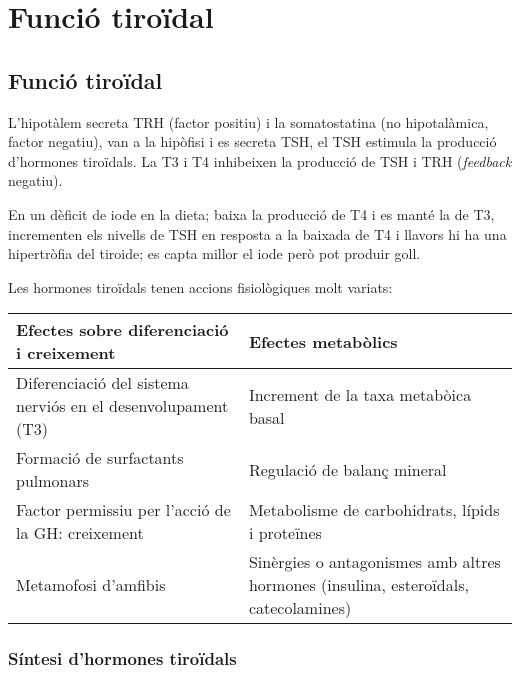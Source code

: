 
\section{Funció tiroïdal}
\label{sec:funcio-tiroidal}


\subsection{Funció tiroïdal}
\label{sec:funcio-tiroida}

L'hipotàlem secreta TRH (factor positiu) i la somatostatina (no
hipotalàmica, factor negatiu), van a la hipòfisi i es secreta TSH, el
TSH estimula la producció d'hormones tiroïdals. La T3 i T4 inhibeixen
la producció de TSH i TRH (\textit{feedback} negatiu).

En un dèficit de iode en la dieta; baixa la producció de T4 i es manté
la de T3, incrementen els nivells de TSH en resposta a la baixada de
T4 i llavors hi ha una hipertròfia del tiroide; es capta millor el
iode però pot produir goll.


Les hormones tiroïdals tenen accions fisiològiques molt variats:

\begin{table}[H]
\centering
\begin{tabular}{>{\centering}m{8cm}>{\centering}m{8cm}}
\hline 
\textbf{Efectes sobre diferenciació i creixement} & \textbf{Efectes metabòlics}\tabularnewline
\hline 
Diferenciació del sistema nerviós en el desenvolupament (T3) & Increment de la taxa metabòica basal\tabularnewline
Formació de surfactants pulmonars & Regulació de balanç mineral\tabularnewline
Factor permissiu per l'acció de la GH: creixement & Metabolisme de carbohidrats, lípids i proteïnes\tabularnewline
Metamofosi d'amfibis & Sinèrgies o antagonismes amb altres hormones (insulina, esteroïdals,
catecolamines)\tabularnewline
\hline 
\end{tabular}
\end{table}

\subsubsection{Síntesi d'hormones tiroïdals}
\label{sec:sint-dhorm-tiro}

